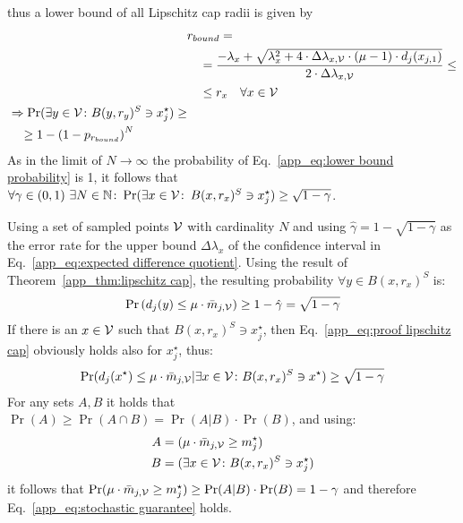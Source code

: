 thus a lower bound of all Lipschitz cap radii is given by
\begin{align}
    & r_{bound} = \nonumber\\
    &\quad=\frac{-\lambda_x + \sqrt{\lambda_x^2 + 4\cdot\Delta\lambda_{x,\mathcal{V}}\cdot(\mu - 1) \cdot d_j(x_{j,1})}}{2\cdot\Delta\lambda_{x,\mathcal{V}}} \le \nonumber\\
    &\quad\le r_x \quad\forall x\in \mathcal{V}\nonumber\\
    \begin{split}
    &\Rightarrow \Pr(\exists y\in\mathcal{V}\colon B(y, r_y)^S\owns x_j^\star) \ge \\
    &\quad\ge 1 - \left(
        1 - p_{r_{bound}}
        \right)^N\label{app_eq:lower bound probability}
    \end{split}
\end{align}
As in the limit of $N\rightarrow \infty$ the probability of Eq.~\eqref{app_eq:lower bound probability} is 1, it follows that $\forall \gamma\in (0,1)~\exists N \in\mathbb{N}\colon\Pr(\exists x\in\mathcal{V}\colon\,B(x,r_x)^S\owns x^\star_j)\ge\sqrt{1-\gamma}$.

Using a set of sampled points $\mathcal{V}$ with cardinality $N$ and using $\hat{\gamma} = 1-\sqrt{1-\gamma}$ as the error rate for the upper bound $\Delta\lambda_x$ of the confidence interval in Eq.~\eqref{app_eq:expected difference quotient}. Using the result of Theorem~\ref{app_thm:lipschitz cap}, the resulting probability $\forall y\in B(x,r_x)^S$ is:
\begin{align}\label{app_eq:proof lipschitz cap}
    \Pr\left(d_j(y) \le \mu\cdot \bar{m}_{j,\mathcal{V}}\right)\ge 1-\hat{\gamma} = \sqrt{1-\gamma}
\end{align}
If there is an $x\in\mathcal{V}$ such that $B(x,r_x)^S\owns x_j^\star$, then Eq.~\eqref{app_eq:proof lipschitz cap} obviously holds also for $x_j^\star$, thus:
\begin{align*}
    \Pr( d_j(x^\star) \le \mu\cdot\bar{m}_{j,\mathcal{V}} |\exists x\in\mathcal{V}\colon B(x,r_x)^S\owns x^\star)\ge \sqrt{1-\gamma}
\end{align*}
For any sets $A, B$ it holds that $\Pr(A)\ge \Pr(A\cap B) = \Pr(A | B) \cdot \Pr(B)$, and using:
\begin{align}
    A &= (\mu\cdot\bar{m}_{j,\mathcal{V}}\ge m^\star_j)\\
    B &= (\exists x\in\mathcal{V}\colon B(x,r_x)^S\owns x_j^\star)
\end{align}
it follows that $\Pr(\mu\cdot\bar{m}_{j,\mathcal{V}}\ge m^\star_j)\ge \Pr(A|B) \cdot \Pr(B) = 1-\gamma$ and therefore Eq.~\eqref{app_eq:stochastic guarantee} holds.


